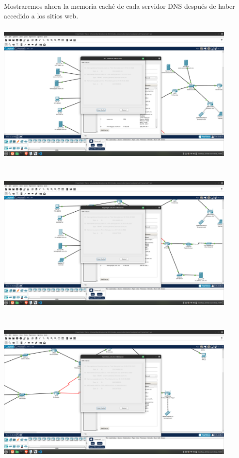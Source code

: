 \documentclass[14pt]{book}
\begin{document}
Mostraremos ahora la memoria caché de cada servidor DNS después de haber accedido a los sitios web.\\

\includegraphics[width=12cm, height=8cm]{images/dns1.png}\\

\includegraphics[width=12cm, height=8cm]{images/dns2.png}\\

\includegraphics[width=12cm, height=8cm]{images/dns3.png}\\
\end{document}
